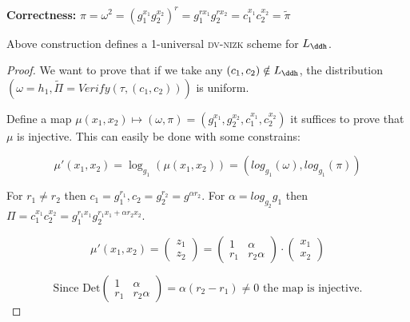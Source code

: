 \textbf{Correctness:} $\pi = \omega^2 = (g_1^{x_1} g_2^{x_2})^r = g_1^{rx_1} g_2^{rx_2} = c_1^{x_1} c_2^{x_2} = \widetilde{\pi}$

\begin{theorem}
    Above construction defines a 1-universal \textsc{dv-nizk} scheme for $L_\ddh$.
\end{theorem}

\begin{proof}
    We want to prove that if we take any $(c_1,c_2) \notin L_\ddh$, the distribution $(\omega = h_1, \widetilde{\Pi} = Verify(\tau, (c_1, c_2)))$ is uniform.

    Define a map $\mu(x_1, x_2) \mapsto (\omega, \pi) = (g_1^{x_1}, g_2^{x_2}, c_1^{x_1}, c_2^{x_2})$ it suffices to prove that $\mu$ is injective. This can easily be done with some constrains:

    \[
        \mu'(x_1, x_2) = \log_{g_1}(\mu(x_1, x_2)) = (log_{g_1}(\omega), log_{g_1}(\pi))
    \]

    For $r_1\neq r_2$ then $c_1=g_1^{r_1},c_2=g_2^{r_2}=g^{\alpha r_2}$. For $\alpha=log_{g_2}g_1$ then $\Pi=c_1^{x_1}c_2^{x_2}=g_1^{r_1x_1}g_2^{r_1x_1+\alpha r_2x_2}$.
    
    \[\mu'(x_1,x_2)=
        \begin{pmatrix}
            z_1\\
            z_2
        \end{pmatrix}
        =
        \begin{pmatrix}
            1 & \alpha \\
            r_1 & r_2\alpha 
        \end{pmatrix}
        \cdot
        \begin{pmatrix}
            x_1\\
            x_2
        \end{pmatrix}
    \]

    \[ \text{Since Det}
    \begin{pmatrix}
        1 & \alpha \\
        r_1 & r_2\alpha 
    \end{pmatrix}=
    \alpha(r_2-r_1)\neq 0
    \text{ the map is injective.}
    \] 

\end{proof}

